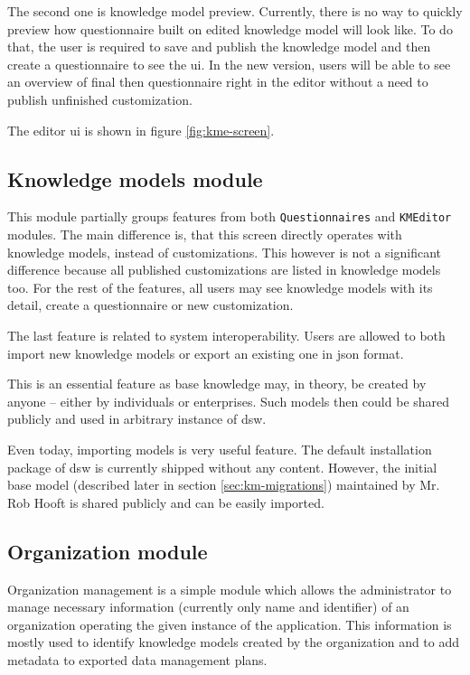 The second one is knowledge model preview.
Currently, there is no way to quickly preview how questionnaire built on edited knowledge model will look like.
To do that, the user is required to save and publish the knowledge model and then create a questionnaire to see the \gls{ui}.
In the new version, users will be able to see an overview of final then questionnaire right in the editor without a need to publish unfinished customization.

The editor \gls{ui} is shown in figure \ref{fig:kme-screen}.


\subsection{Knowledge models module}

This module partially groups features from both \texttt{Questionnaires} and \texttt{KMEditor} modules.
The main difference is, that this screen directly operates with knowledge models, instead of customizations.
This however is not a significant difference because all published customizations are listed in knowledge models too.
For the rest of the features, all users may see knowledge models with its detail, create a questionnaire or new customization.

The last feature is related to system interoperability.
Users are allowed to both import new knowledge models or export an existing one in \gls{json} format.

This is an essential feature as base knowledge may, in theory, be created by anyone -- either by individuals or enterprises.
Such models then could be shared publicly and used in arbitrary instance of \gls{dsw}.

Even today, importing models is very useful feature.
The default installation package of \gls{dsw} is currently shipped without any content.
However, the initial base model (described later in section \ref{sec:km-migrations}) maintained by Mr. Rob Hooft is shared publicly and can be easily imported.

\subsection{Organization module}

Organization management is a simple module which allows the administrator to manage necessary information (currently only name and identifier) of an organization operating the given instance of the application.
This information is mostly used to identify knowledge models created by the organization and to add metadata to exported data management plans.

